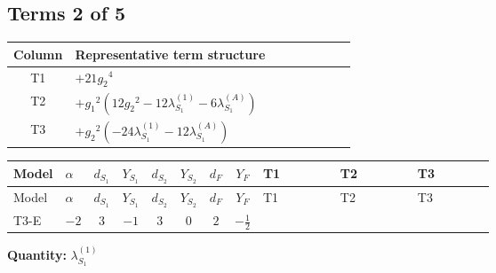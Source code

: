 \documentclass[8pt]{article}
\begin{document}
\begin{landscape}
\subsection*{Terms 2 of 5}
\begin{center}
\begin{tabular}{@{}c >{\raggedright\arraybackslash}p{0.82\linewidth}@{}}
\toprule
Column & Representative term structure \\
\midrule
T1 & \(\displaystyle +21 {g_2}^4\) \\
\midrule
T2 & \(\displaystyle +{g_1}^2 \left(12 {g_2}^2-12 {\lambda_{S_1}^{(1)}}-6 {\lambda_{S_1}^{(A)}}\right)\) \\
\midrule
T3 & \(\displaystyle +{g_2}^2 (-24 {\lambda_{S_1}^{(1)}}-12 {\lambda_{S_1}^{(A)}})\) \\
\midrule
\bottomrule
\end{tabular}
\end{center}
\smallskip
\tiny
\begin{longtable}{@{}llcccccc >{\raggedright\arraybackslash}p{0.21\linewidth} >{\raggedright\arraybackslash}p{0.21\linewidth} >{\raggedright\arraybackslash}p{0.21\linewidth}@{}}
\toprule
Model & $\alpha$ & $d_{S_1}$ & $Y_{S_1}$ & $d_{S_2}$ & $Y_{S_2}$ & $d_F$ & $Y_F$ & T1 & T2 & T3 \\
\midrule
\endfirsthead
\toprule
Model & $\alpha$ & $d_{S_1}$ & $Y_{S_1}$ & $d_{S_2}$ & $Y_{S_2}$ & $d_F$ & $Y_F$ & T1 & T2 & T3 \\
\midrule
\endhead
T3-E & $-2$ & $3$ & $-1$ & $3$ & $0$ & $2$ & $-\frac{1}{2}$ & \scriptsize\adjustbox{max width=\linewidth}{$\begin{gathered} +21 {g_2}^4\end{gathered}$} & \scriptsize\adjustbox{max width=\linewidth}{$\begin{gathered} +{g_1}^2 \left(12 {g_2}^2-12 {\lambda_{S_1}^{(1)}}-6 {\lambda_{S_1}^{(A)}}\right)\end{gathered}$} & \scriptsize\adjustbox{max width=\linewidth}{$\begin{gathered} +{g_2}^2 (-24 {\lambda_{S_1}^{(1)}}-12 {\lambda_{S_1}^{(A)}})\end{gathered}$} \\
\midrule
\bottomrule
\end{longtable}
\clearpage
\noindent\textbf{Quantity: }$\lambda_{S_1}^{(1)}$\par\smallskip

\end{landscape}
\end{document}
